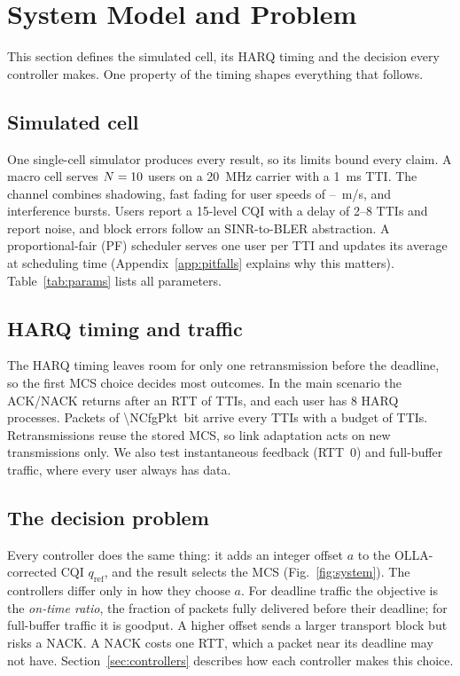 \section{System Model and Problem}\label{sec:system}
This section defines the simulated cell, its HARQ timing and the decision every controller makes. One property of the timing shapes everything that follows.

\subsection{Simulated cell}
One single-cell simulator produces every result, so its limits bound every claim. A macro cell serves $N=10$ users on a \SI{20}{MHz} carrier with a \SI{1}{ms} TTI. The channel combines shadowing, fast fading for user speeds of \NCfgSpeedMin--\NCfgSpeedMax~m/s, and interference bursts. Users report a 15-level CQI with a delay of 2--8 TTIs and report noise, and block errors follow an SINR-to-BLER abstraction. A proportional-fair (PF) scheduler serves one user per TTI and updates its average at scheduling time (Appendix~\ref{app:pitfalls} explains why this matters). Table~\ref{tab:params} lists all parameters.

\subsection{HARQ timing and traffic}
The HARQ timing leaves room for only one retransmission before the deadline, so the first MCS choice decides most outcomes. In the main scenario the ACK/NACK returns after an RTT of \NCfgRtt{} TTIs, and each user has 8 HARQ processes. Packets of \SI{\NCfgPkt}{bit} arrive every \NCfgPeriod{} TTIs with a budget of \NCfgDeadline{} TTIs. Retransmissions reuse the stored MCS, so link adaptation acts on new transmissions only. We also test instantaneous feedback (RTT~0) and full-buffer traffic, where every user always has data.

\subsection{The decision problem}
Every controller does the same thing: it adds an integer offset $a$ to the OLLA-corrected CQI $q_\mathrm{ref}$, and the result selects the MCS (Fig.~\ref{fig:system}). The controllers differ only in how they choose $a$. For deadline traffic the objective is the \emph{on-time ratio}, the fraction of packets fully delivered before their deadline; for full-buffer traffic it is goodput. A higher offset sends a larger transport block but risks a NACK. A NACK costs one RTT, which a packet near its deadline may not have. Section~\ref{sec:controllers} describes how each controller makes this choice.

